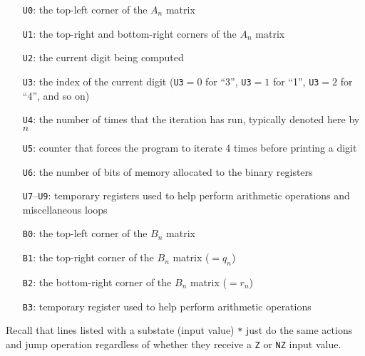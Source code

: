 \begin{itemize}
	\item[\texttt{U0}:] the top-left corner of the $A_n$ matrix
	
	\item[\texttt{U1}:] the top-right and bottom-right corners of the $A_n$ matrix
	
	\item[\texttt{U2}:] the current digit being computed
	
	\item[\texttt{U3}:] the index of the current digit (\texttt{U3}${} = 0$ for ``3'', \texttt{U3}${} = 1$ for ``1'', \texttt{U3}${} = 2$ for ``4'', and so on)
	
	\item[\texttt{U4}:] the number of times that the iteration has run, typically denoted here by $n$
	
	\item[\texttt{U5}:] counter that forces the program to iterate 4 times before printing a digit

	\item[\texttt{U6}:] the number of bits of memory allocated to the binary registers
	
	\item[\texttt{U7}--\texttt{U9}:] temporary registers used to help perform arithmetic operations and miscellaneous loops\smallskip
	
	\item[\texttt{B0}:] the top-left corner of the $B_n$ matrix
	
	\item[\texttt{B1}:] the top-right corner of the $B_n$ matrix ($= q_n$)
	
	\item[\texttt{B2}:] the bottom-right corner of the $B_n$ matrix ($= r_n$)
	
	\item[\texttt{B3}:] temporary register used to help perform arithmetic operations\smallskip
\end{itemize}

Recall that lines listed with a substate (input value) \texttt{*} just do the same actions and jump operation regardless of whether they receive a \texttt{Z} or \texttt{NZ} input value.

